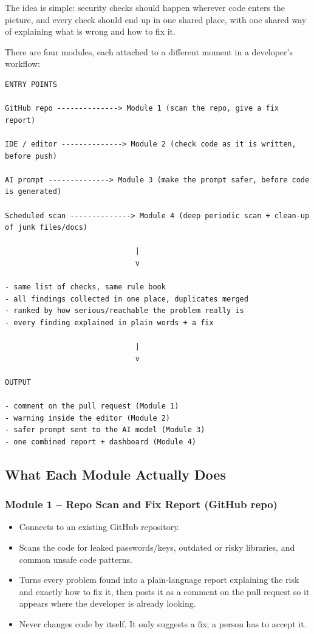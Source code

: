 \documentclass[11pt,a4paper]{article}
\begin{document}
The idea is simple: security checks should happen wherever code enters the picture, and every check should end up in one shared place, with one shared way of explaining what is wrong and how to fix it.

There are four modules, each attached to a different moment in a developer's workflow:

\begin{verbatim}
ENTRY POINTS

GitHub repo --------------> Module 1 (scan the repo, give a fix report)

IDE / editor --------------> Module 2 (check code as it is written, before push)

AI prompt --------------> Module 3 (make the prompt safer, before code is generated)

Scheduled scan --------------> Module 4 (deep periodic scan + clean-up of junk files/docs)

                              |
                              v

- same list of checks, same rule book
- all findings collected in one place, duplicates merged
- ranked by how serious/reachable the problem really is
- every finding explained in plain words + a fix

                              |
                              v

OUTPUT

- comment on the pull request (Module 1)
- warning inside the editor (Module 2)
- safer prompt sent to the AI model (Module 3)
- one combined report + dashboard (Module 4)
\end{verbatim}

\subsection{What Each Module Actually Does}

\subsubsection{Module 1 -- Repo Scan and Fix Report (GitHub repo)}

\begin{itemize}[leftmargin=0.7cm]

    \item Connects to an existing GitHub repository.

    \item Scans the code for leaked passwords/keys, outdated or risky libraries, and common unsafe code patterns.

    \item Turns every problem found into a plain-language report explaining the risk and exactly how to fix it, then posts it as a comment on the pull request so it appears where the developer is already looking.

    \item Never changes code by itself. It only suggests a fix; a person has to accept it.

\end{itemize}
\end{document}
